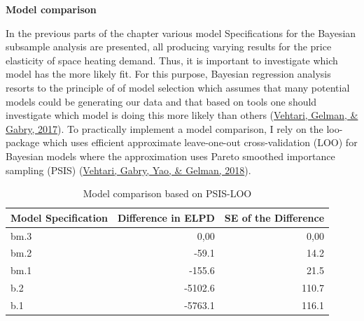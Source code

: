 \documentclass[12pt,twoside]{reedthesis}
\begin{document}
\textbf{Model comparison}

In the previous parts of the chapter various model Specifications for the Bayesian subsample analysis are presented, all producing varying results for the price elasticity of space heating demand. Thus, it is important to investigate which model has the more likely fit. For this purpose, Bayesian regression analysis resorts to the principle of of model selection which assumes that many potential models could be generating our data and that based on tools one should investigate which model is doing this more likely than others (\protect\hyperlink{ref-vehtari_etal17}{Vehtari, Gelman, \& Gabry, 2017}). To practically implement a model comparison, I rely on the loo-package which uses efficient approximate leave-one-out cross-validation (LOO) for Bayesian models where the approximation uses Pareto smoothed importance sampling (PSIS) (\protect\hyperlink{ref-vehtari2018loo}{Vehtari, Gabry, Yao, \& Gelman, 2018}).
\begin{table}[]
\centering
\caption{Model comparison based on PSIS-LOO}
\label{tab:model-comparison}
\begin{tabular}{@{}lrr@{}}
\toprule
\textbf{Model Specification} & \multicolumn{1}{l}{\textbf{Difference in ELPD}} & \multicolumn{1}{l}{\textbf{SE of the Difference}} \\ \midrule
bm.3 & 0,00 & 0,00 \\
bm.2 & -59.1 & 14.2 \\
bm.1 & -155.6 & 21.5 \\
b.2 & -5102.6 & 110.7 \\
b.1 & -5763.1 & 116.1 \\ \bottomrule
\end{tabular}
\end{table}
\par
\end{document}
